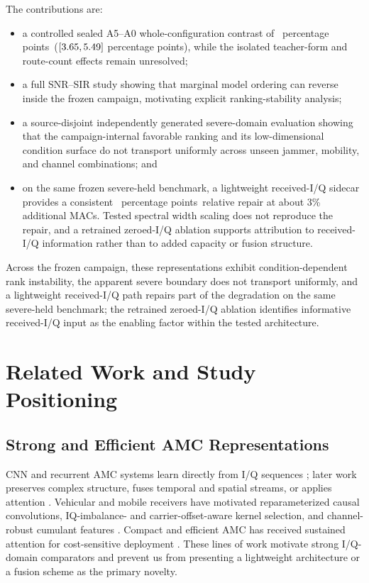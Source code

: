 \documentclass[letterpaper,journal]{IEEEtran}
\newcommand{\pp}{percentage points}
\begin{document}
The contributions are:
\begin{itemize}
  \item a controlled sealed A5--A0 whole-configuration contrast of
  \MethodEffectDiff\ \pp\
  ($[3.65,5.49]$ \pp), while the isolated
  teacher-form and route-count effects remain unresolved;
  \item a full SNR--SIR study showing that marginal model ordering can reverse
  inside the frozen campaign, motivating explicit ranking-stability analysis;
  \item a \mbox{source-disjoint} independently generated severe-domain evaluation
  showing that the campaign-internal favorable ranking and its low-dimensional
  condition surface do not transport uniformly across unseen jammer, mobility,
  and channel combinations; and
  \item on the same frozen severe-held benchmark, a lightweight received-I/Q
  sidecar provides a consistent \SevereRepairDiff\ \pp\ relative repair at
  about 3\% additional MACs. Tested spectral width scaling does not reproduce
  the repair, and a retrained zeroed-I/Q ablation
  supports attribution to received-I/Q information rather than to added
  capacity or fusion structure.
\end{itemize}

Across the frozen campaign, these representations exhibit condition-dependent
rank instability, the apparent severe boundary does not transport uniformly,
and a lightweight received-I/Q path repairs part of the degradation on the
same severe-held benchmark; the retrained zeroed-I/Q ablation identifies
informative received-I/Q input as the enabling factor within the tested
architecture.

\section{Related Work and Study Positioning}
\subsection{Strong and Efficient AMC Representations}
CNN and recurrent AMC systems learn directly from I/Q sequences
\cite{oshea2016cnn,meng2018amc,xu2020mcldnn}; later work preserves complex
structure, fuses temporal and spatial streams, or applies attention
\cite{tu2020complex,zhang2020dual,cai2022transformer,shao2025iqformer}.
Vehicular and mobile receivers have motivated reparameterized causal
convolutions, IQ-imbalance- and carrier-offset-aware kernel selection, and
channel-robust cumulant
features \cite{tang2024repccnet,ren2024crosssknet,huang2024csqcc}. Compact and
efficient AMC has received sustained attention for cost-sensitive deployment
\cite{wang2020lightamc,efficientamc2026tgcn}. These lines of work
motivate strong I/Q-domain comparators and prevent us from presenting a
lightweight architecture or a fusion scheme as the primary novelty.
\end{document}
